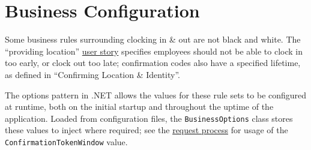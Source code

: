 \section{Business Configuration}

Some business rules surrounding clocking in \& out are not
black and white. The \enquote{providing location}
\hyperref[ss:stores]{user story} specifies employees should
not be able to clock in too early, or clock out too late;
confirmation codes also have a specified lifetime, as
defined in \enquote{Confirming Location \& Identity}. 

The options pattern in .NET allows the values for these rule
sets to be configured at runtime, both on the initial
startup and throughout the uptime of the application. Loaded
from configuration files, the \lstinline{BusinessOptions}
class stores these values to inject where required; see
the \hyperref[requestProcess]{request process} for usage of
the \lstinline{ConfirmationTokenWindow} value.